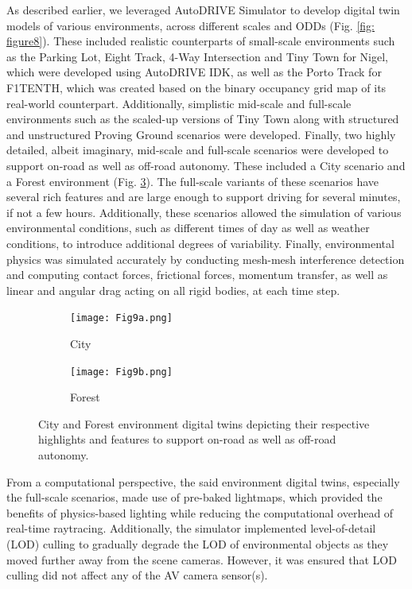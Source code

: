 As described earlier, we leveraged AutoDRIVE Simulator \cite{AutoDRIVESimulator, AutoDRIVESimulatorReport} to develop digital twin models of various environments, across different scales and ODDs (Fig. \ref{fig: figure8}). These included realistic counterparts of small-scale environments such as the Parking Lot, Eight Track, 4-Way Intersection and Tiny Town for Nigel, which were developed using AutoDRIVE IDK, as well as the Porto Track for F1TENTH, which was created based on the binary occupancy grid map of its real-world counterpart. Additionally, simplistic mid-scale and full-scale environments such as the scaled-up versions of Tiny Town along with structured and unstructured Proving Ground scenarios were developed. Finally, two highly detailed, albeit imaginary, mid-scale and full-scale scenarios were developed to support on-road as well as off-road autonomy. These included a City scenario and a Forest environment (Fig. \ref{figure9}). The full-scale variants of these scenarios have several rich features and are large enough to support driving for several minutes, if not a few hours. Additionally, these scenarios allowed the simulation of various environmental conditions, such as different times of day as well as weather conditions, to introduce additional degrees of variability. Finally, environmental physics was simulated accurately by conducting mesh-mesh interference detection and computing contact forces, frictional forces, momentum transfer, as well as linear and angular drag acting on all rigid bodies, at each time step.

\begin{figure}[h]
     \centering
     \begin{subfigure}[b]{0.49\linewidth}
         \centering
         \texttt{[image: Fig9a.png]}
         \caption{City}
         \label{fig9a}
     \end{subfigure}
     \hfill
     \begin{subfigure}[b]{0.49\linewidth}
         \centering
         \texttt{[image: Fig9b.png]}
         \caption{Forest}
         \label{fig9b}
     \end{subfigure}
     \caption{City and Forest environment digital twins depicting their respective highlights and features to support on-road as well as off-road autonomy.}
    \label{figure9}
\end{figure}

From a computational perspective, the said environment digital twins, especially the full-scale scenarios, made use of pre-baked lightmaps, which provided the benefits of physics-based lighting while reducing the computational overhead of real-time raytracing. Additionally, the simulator implemented level-of-detail (LOD) culling to gradually degrade the LOD of environmental objects as they moved further away from the scene cameras. However, it was ensured that LOD culling did not affect any of the AV camera sensor(s).

